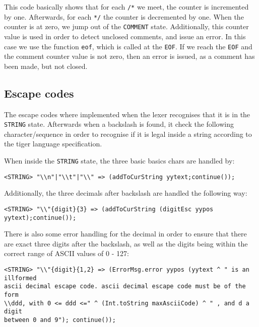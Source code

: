 \documentclass{article}
\begin{document}
This code basically shows that for each \texttt{/*} we meet, the counter is incremented by one. Afterwards, for each \texttt{*/} the counter is decremented by one. When the counter is at zero, we jump out of the \texttt{COMMENT} state. Additionally, this counter value is used in order to detect unclosed comments, and issue an error. In this case we use the function \texttt{eof}, which is called at the \texttt{EOF}. If we reach the \texttt{EOF} and the comment counter value is not zero, then an error is issued, as a comment has been made, but not closed.  

\subsection{Escape codes}
The escape codes where implemented when the lexer recognises that it is in the \texttt{STRING} state. Afterwards when a backslash is found, it check the following character/sequence in order to recognise if it is legal inside a string according to the tiger language specification. 


When inside the \texttt{STRING} state, the three basic basics chars are handled by:

\begin{lstlisting}[frame=single]
<STRING> "\\n"|"\\t"|"\\" => (addToCurString yytext;continue());
\end{lstlisting}

Additionally, the three decimals after backslash are handled the following way:

\begin{lstlisting}[frame=single]
<STRING> "\\"{digit}{3} => (addToCurString (digitEsc yypos yytext);continue());
\end{lstlisting}

There is also some error handling for the decimal in order to ensure that there are exact three digits after the backslash, as well as the digits being within the correct range of ASCII values of 0 - 127:
\begin{lstlisting}[frame=single]
<STRING> "\\"{digit}{1,2} => (ErrorMsg.error yypos (yytext ^ " is an illformed 
ascii decimal escape code. ascii decimal escape code must be of the form 
\\ddd, with 0 <= ddd <=" ^ (Int.toString maxAsciiCode) ^ " , and d a digit 
between 0 and 9"); continue());
\end{lstlisting}
\end{document}
